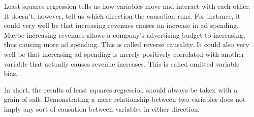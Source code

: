 \documentclass{article}
\begin{document}
Least squares regression tells us how variables move and interact with each other. It doesn't, however, tell us which direction the causation runs. For instance, it could very well be that increasing revenues causes an increase in ad spending. Maybe increasing revenues allows a company's advertising budget to increasing, thus causing more ad spending. This is called reverse causality. It could also very well be that increasing ad spending is merely positively correlated with another variable that actually causes revenue increases. This is called omitted variable bias.  
     
In short, the results of least squares regression should always be taken with a grain of salt. Demonstrating a mere relationship between two variables does not imply any sort of causation between variables in either direction. 
\end{document}
